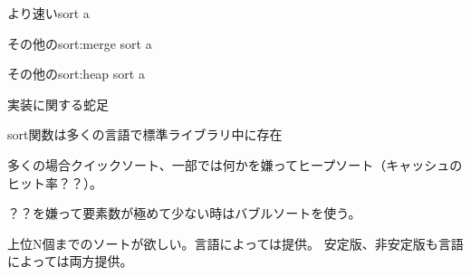 \documentclass{beamer}
\begin{document}
\begin{frame}[fragile]{より速いsort}{}
a
\end{frame}

\begin{frame}[fragile]{その他のsort:merge sort}{}
a
\end{frame}

\begin{frame}[fragile]{その他のsort:heap sort}{}
a
\end{frame}

\begin{frame}[fragile]{実装に関する蛇足}{}

sort関数は多くの言語で標準ライブラリ中に存在

多くの場合クイックソート、一部では何かを嫌ってヒープソート（キャッシュのヒット率？？）。

？？を嫌って要素数が極めて少ない時はバブルソートを使う。

上位N個までのソートが欲しい。言語によっては提供。
安定版、非安定版も言語によっては両方提供。

\end{frame}
\end{document}
